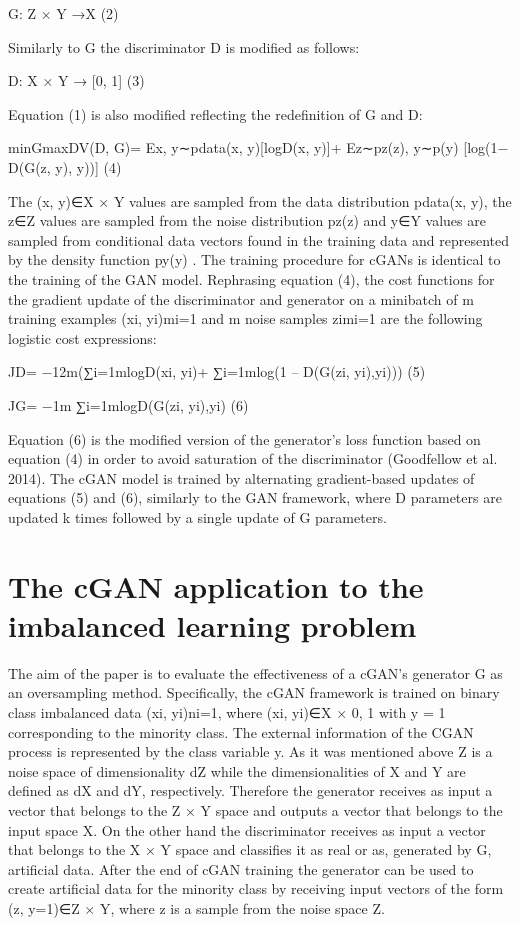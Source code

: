\documentclass[parskip=full]{scrartcl}
\begin{document}
G: Z × Y →X                    (2)
 
Similarly to G the discriminator D is modified as follows: 

D: X × Y → [0, 1]                  (3)
 
Equation (1) is also modified reflecting the redefinition of G and D: 

 minGmaxDV(D, G)= Ex, y∼pdata(x, y)[logD(x, y)]+ Ez∼pz(z),  y∼p(y) [log(1− D(G(z,
y), y))]                   (4)
  
The (x, y)∈X × Y values are sampled from the data distribution pdata(x, y), the
z∈Z values are sampled from the noise distribution pz(z) and y∈Y values are
sampled from conditional data vectors found in the training data and represented
by the density function py(y) . The training procedure for cGANs is identical to
the training of the GAN model. Rephrasing equation (4), the cost functions for
the gradient update of the discriminator and generator on a minibatch of m
training examples {(xi, yi)}mi=1 and m noise samples {zi}mi=1 are the following
logistic cost expressions:

JD= −12m(∑i=1mlogD(xi, yi)+ ∑i=1mlog(1 – D(G(zi, yi),yi))) (5)
 
JG= −1m ∑i=1mlogD(G(zi, yi),yi) (6)
 
Equation (6) is the modified version of the generator’s loss function based on
equation (4) in order to avoid saturation of the discriminator (Goodfellow et
al. 2014). The cGAN model is trained by alternating gradient-based updates of
equations (5) and (6), similarly to the GAN framework, where D parameters are
updated k times followed by a single update of G parameters. 

\section{The cGAN application to the imbalanced learning problem }

The aim of the paper is to evaluate the effectiveness of a cGAN’s generator G as
an oversampling method. Specifically, the cGAN framework is trained on binary
class imbalanced data {(xi, yi)}ni=1, where (xi, yi)∈X × {0, 1} with y = 1
corresponding to the minority class. The external information of the CGAN
process is represented by the class variable y. As it was mentioned above Z is a
noise space of dimensionality dZ while the dimensionalities of X and Y are
defined as dX and dY, respectively. Therefore the generator receives as input a
vector that belongs to the Z × Y space and outputs a vector that belongs to the
input space X. On the other hand the discriminator receives as input a vector
that belongs to the X × Y space and classifies it as real or as, generated by G,
artificial data. After the end of cGAN training the generator can be used to
create artificial data for the minority class by receiving input vectors of the
form (z, y=1)∈Z × Y, where z is a sample from the noise space Z. 
\end{document}
